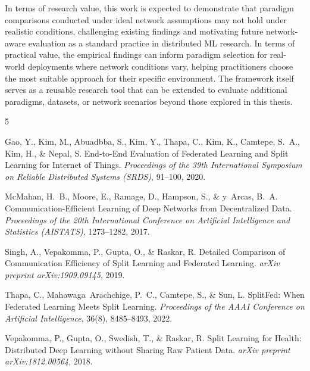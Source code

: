 \documentclass[12pt]{article}
\begin{document}
In terms of research value, this work is expected to demonstrate that paradigm comparisons conducted under ideal network assumptions may not hold under realistic conditions, challenging existing findings and motivating future network-aware evaluation as a standard practice in distributed ML research. In terms of practical value, the empirical findings can inform paradigm selection for real-world deployments where network conditions vary, helping practitioners choose the most suitable approach for their specific environment. The framework itself serves as a reusable research tool that can be extended to evaluate additional paradigms, datasets, or network scenarios beyond those explored in this thesis.



\begin{thebibliography}{5}

Gao, Y., Kim, M., Abuadbba, S., Kim, Y., Thapa, C., Kim, K., Camtepe, S.~A., Kim, H., \& Nepal, S.
\newblock End-to-End Evaluation of Federated Learning and Split Learning for Internet of Things.
\newblock \emph{Proceedings of the 39th International Symposium on Reliable Distributed Systems (SRDS)}, 91--100, 2020.

McMahan, H.~B., Moore, E., Ramage, D., Hampson, S., \& y~Arcas, B.~A.
\newblock Communication-Efficient Learning of Deep Networks from Decentralized Data.
\newblock \emph{Proceedings of the 20th International Conference on Artificial Intelligence and Statistics (AISTATS)}, 1273--1282, 2017.

Singh, A., Vepakomma, P., Gupta, O., \& Raskar, R.
\newblock Detailed Comparison of Communication Efficiency of Split Learning and Federated Learning.
\newblock \emph{arXiv preprint arXiv:1909.09145}, 2019.

Thapa, C., Mahawaga~Arachchige, P.~C., Camtepe, S., \& Sun, L.
\newblock SplitFed: When Federated Learning Meets Split Learning.
\newblock \emph{Proceedings of the AAAI Conference on Artificial Intelligence}, 36(8), 8485--8493, 2022.

Vepakomma, P., Gupta, O., Swedish, T., \& Raskar, R.
\newblock Split Learning for Health: Distributed Deep Learning without Sharing Raw Patient Data.
\newblock \emph{arXiv preprint arXiv:1812.00564}, 2018.

\end{thebibliography}
\end{document}

